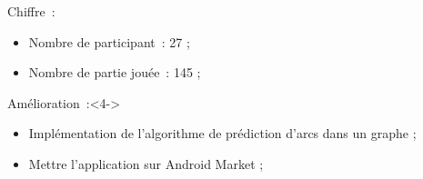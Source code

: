 \documentclass{beamer}
\begin{document}
\begin{frame}
  \begin{block}{Chiffre~:}
    \begin{itemize}
      \item<2-> Nombre de participant~: 27 ;
      \item<3-> Nombre de partie jou\'ee~: 145 ;
    \end{itemize}
  \end{block}
  \begin{block}{Am\'elioration~:}<4->
    \begin{itemize}
      \item<5-> Implémentation de l'algorithme de prédiction d'arcs dans un graphe ;
      \item<6-> Mettre l'application sur Android Market ;
    \end{itemize}
  \end{block}
\end{frame}

\end{document}
